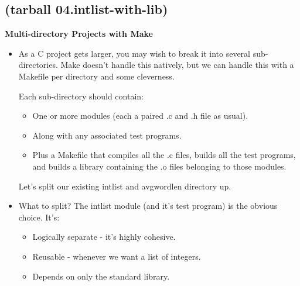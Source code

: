 \documentclass[aspectratio=169]{beamer}
\newcommand\myheading[1]{%
  \par\bigskip
  {\Large\bfseries#1}\par\smallskip}
\begin{document}
\subsection{(tarball 04.intlist-with-lib)}

\begin{frame}[fragile]
\myheading{Multi-directory Projects with Make}
\begin{itemize}
  \item
  As a C project gets larger, you may wish to break it into several
  sub-directories.  Make doesn't handle this natively, but we can
  handle this with a \alert{Makefile} per directory and some cleverness.

  \pitem
  Each sub-directory should contain:
  \begin{itemize}
    \item
    One or more \alert{modules} (each a paired .c and .h file as usual).
    \item
    Along with any associated test programs.
    \item
    Plus a Makefile that compiles all the .c files, builds all the test
    programs, and builds a \alert{library} containing the \alert{.o}
    files belonging to those modules.
  \end{itemize}

  \pitem
  Let's split our existing intlist and avgwordlen directory up.

  \item
  What to split?
  \pause
  The intlist module (and it's test program) is the obvious choice.  It's:

    \begin{itemize}
    \item
    Logically separate - it's \alert{highly cohesive}.
    \item
    Reusable - whenever we want a list of integers.
    \item
    Depends on only the standard library.
    \end{itemize}

\end{itemize}
\end{frame}
\end{document}
